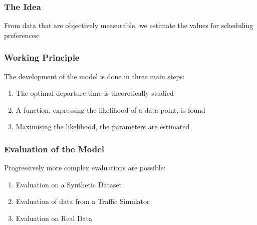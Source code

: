 \documentclass[hyperref={pdfpagelabels=false}]{beamer}
\begin{document}
\begin{frame}
  \frametitle{The Idea}
  From data that are objectively measurable,
  we estimate the values for scheduling preferences:
  
  \begin{figure}
    \centering
  \end{figure}
\end{frame}

\begin{frame}
  \frametitle{Working Principle}
  The development of the model is done in three main steps:
  \begin{enumerate}
  \item The optimal departure time is theoretically studied
  \item A function, expressing the likelihood of a data point, is found
  \item Maximising the likelihood, the parameters are estimated
  \end{enumerate}
\end{frame}

\begin{frame}
  \frametitle{Evaluation of the Model}
  Progressively more complex evaluations are possible:
  \begin{enumerate}
  \item Evaluation on a Synthetic Dataset
  \item Evaluation of data from a Traffic Simulator
  \item Evaluation on Real Data
  \end{enumerate}
\end{frame}
\end{document}
